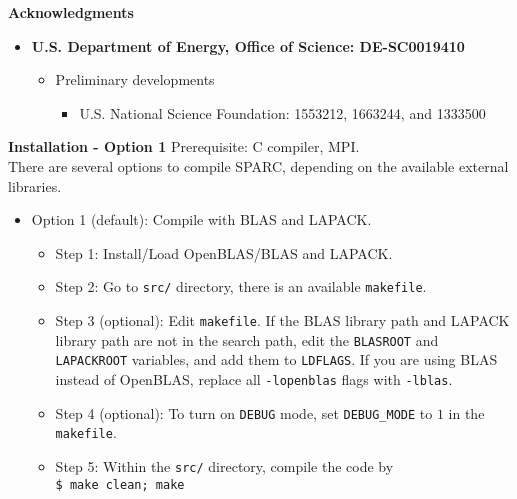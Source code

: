   
  \begin{frame}[allowframebreaks]{\textbf{Acknowledgments}} \label{Acknowledgments}
  
  \begin{itemize}
      \item \textbf{U.S. Department of Energy, Office of Science: DE-SC0019410} \\
      \vspace{10pt}
      \begin{itemize}
          \item Preliminary developments
          \begin{itemize}
              \item U.S. National Science Foundation: 1553212, 1663244, and 1333500
          \end{itemize}
      \end{itemize}
      
      
  \end{itemize}
  
  \end{frame}
  
  \begin{frame}{\textbf{Installation - Option 1}} \label{Installation:1}
  Prerequisite: C compiler, MPI.\\
  There are several options to compile SPARC, depending on the available external libraries.
  \begin{itemize}
  \item Option 1 (default): Compile with BLAS and LAPACK.
    \begin{itemize}
      \item Step 1: Install/Load OpenBLAS/BLAS and LAPACK.
      \item Step 2: Go to \texttt{src/} directory, there is an available \texttt{makefile}.
      \item Step 3 (optional): Edit \texttt{makefile}. If the BLAS library path and LAPACK library path are not in the search path, edit the \texttt{BLASROOT} and \texttt{LAPACKROOT} variables, and add them to \texttt{LDFLAGS}. If you are using BLAS instead of OpenBLAS, replace all \texttt{-lopenblas} flags with \texttt{-lblas}.
      \item Step 4 (optional): To turn on \texttt{DEBUG} mode, set \texttt{DEBUG\_MODE} to $1$ in the \texttt{makefile}.
      \item Step 5: Within the \texttt{src/} directory, compile the code by \\
            \texttt{\$ make clean; make}
    \end{itemize}
  \end{itemize}
  \end{frame}
  
